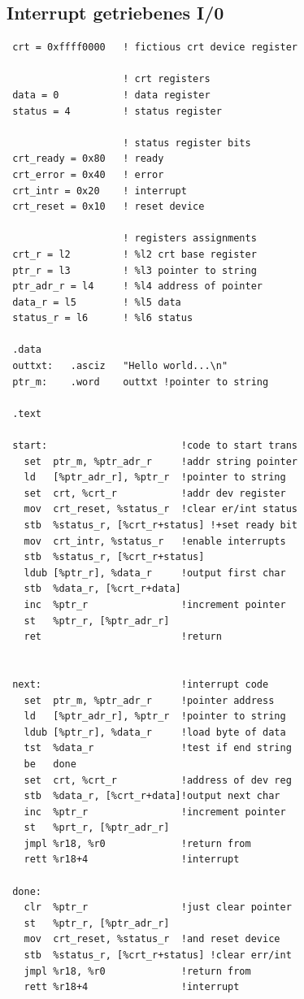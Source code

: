 \documentclass[german, 10pt, a4paper, twocolumn]{scrartcl}
\begin{document}
\subsection{Interrupt getriebenes I/0}

\begin{verbatim}
 crt = 0xffff0000   ! fictious crt device register
 
                    ! crt registers
 data = 0           ! data register
 status = 4         ! status register

                    ! status register bits
 crt_ready = 0x80   ! ready
 crt_error = 0x40   ! error
 crt_intr = 0x20    ! interrupt
 crt_reset = 0x10   ! reset device

                    ! registers assignments
 crt_r = l2         ! %l2 crt base register
 ptr_r = l3         ! %l3 pointer to string
 ptr_adr_r = l4     ! %l4 address of pointer
 data_r = l5        ! %l5 data
 status_r = l6      ! %l6 status

 .data
 outtxt:   .asciz   "Hello world...\n"
 ptr_m:    .word    outtxt !pointer to string

 .text

 start:                       !code to start trans
   set  ptr_m, %ptr_adr_r     !addr string pointer
   ld   [%ptr_adr_r], %ptr_r  !pointer to string
   set  crt, %crt_r           !addr dev register
   mov  crt_reset, %status_r  !clear er/int status
   stb  %status_r, [%crt_r+status] !+set ready bit
   mov  crt_intr, %status_r   !enable interrupts
   stb  %status_r, [%crt_r+status]
   ldub [%ptr_r], %data_r     !output first char
   stb  %data_r, [%crt_r+data]
   inc  %ptr_r                !increment pointer
   st   %ptr_r, [%ptr_adr_r]
   ret                        !return


 next:                        !interrupt code
   set  ptr_m, %ptr_adr_r     !pointer address
   ld   [%ptr_adr_r], %ptr_r  !pointer to string
   ldub [%ptr_r], %data_r     !load byte of data
   tst  %data_r               !test if end string
   be   done
   set  crt, %crt_r           !address of dev reg
   stb  %data_r, [%crt_r+data]!output next char
   inc  %ptr_r                !increment pointer
   st   %prt_r, [%ptr_adr_r]
   jmpl %r18, %r0             !return from
   rett %r18+4                !interrupt

 done:
   clr  %ptr_r                !just clear pointer
   st   %ptr_r, [%ptr_adr_r]
   mov  crt_reset, %status_r  !and reset device
   stb  %status_r, [%crt_r+status] !clear err/int
   jmpl %r18, %r0             !return from
   rett %r18+4                !interrupt
\end{verbatim}
\end{document}
